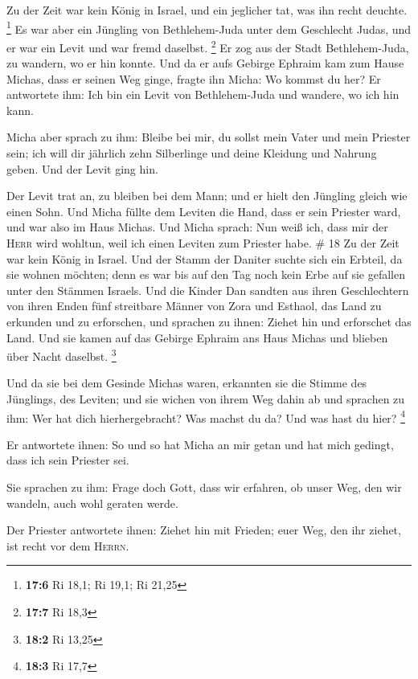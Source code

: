  Zu der Zeit war kein König in Israel, und ein jeglicher
tat, was ihn recht deuchte. \footnote{\textbf{17:6} Ri 18,1; Ri 19,1; Ri
  21,25}  Es war aber ein Jüngling von Bethlehem-Juda
unter dem Geschlecht Judas, und er war ein Levit und war fremd daselbst.
\footnote{\textbf{17:7} Ri 18,3}  Er zog aus der Stadt
Bethlehem-Juda, zu wandern, wo er hin konnte. Und da er aufs Gebirge
Ephraim kam zum Hause Michas, dass er seinen Weg ginge, 
fragte ihn Micha: Wo kommst du her? Er antwortete ihm: Ich bin ein Levit
von Bethlehem-Juda und wandere, wo ich hin kann.

 Micha aber sprach zu ihm: Bleibe bei mir, du sollst mein
Vater und mein Priester sein; ich will dir jährlich zehn Silberlinge und
deine Kleidung und Nahrung geben. Und der Levit ging hin.

 Der Levit trat an, zu bleiben bei dem Mann; und er hielt
den Jüngling gleich wie einen Sohn.  Und Micha füllte dem
Leviten die Hand, dass er sein Priester ward, und war also im Haus
Michas.  Und Micha sprach: Nun weiß ich, dass mir der
\textsc{Herr} wird wohltun, weil ich einen Leviten zum Priester habe. \#
18  Zu der Zeit war kein König in Israel. Und der Stamm
der Daniter suchte sich ein Erbteil, da sie wohnen möchten; denn es war
bis auf den Tag noch kein Erbe auf sie gefallen unter den Stämmen
Israels.  Und die Kinder Dan sandten aus ihren
Geschlechtern von ihren Enden fünf streitbare Männer von Zora und
Esthaol, das Land zu erkunden und zu erforschen, und sprachen zu ihnen:
Ziehet hin und erforschet das Land. Und sie kamen auf das Gebirge
Ephraim ans Haus Michas und blieben über Nacht daselbst. \footnote{\textbf{18:2}
  Ri 13,25}

 Und da sie bei dem Gesinde Michas waren, erkannten sie
die Stimme des Jünglings, des Leviten; und sie wichen von ihrem Weg
dahin ab und sprachen zu ihm: Wer hat dich hierhergebracht? Was machst
du da? Und was hast du hier? \footnote{\textbf{18:3} Ri 17,7}

 Er antwortete ihnen: So und so hat Micha an mir getan und
hat mich gedingt, dass ich sein Priester sei.

 Sie sprachen zu ihm: Frage doch Gott, dass wir erfahren,
ob unser Weg, den wir wandeln, auch wohl geraten werde.

 Der Priester antwortete ihnen: Ziehet hin mit Frieden;
euer Weg, den ihr ziehet, ist recht vor dem \textsc{Herrn}.

